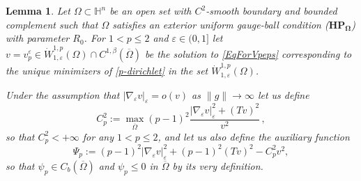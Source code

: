 \documentclass[10pt]{amsart}
\numberwithin{equation}{section}
\newtheorem{lemma}[theorem]{Lemma}
\theoremstyle{definition}
\newcommand{\He}{\mathbb{H}}
\begin{document}
\begin{lemma}\label{lem:conti_in_xp}
Let $\Omega \subset \He^n$ be an open set with $C^2$-smooth boundary and bounded complement such that $\Omega$ satisfies an exterior uniform gauge-ball condition ($\mathbf{HP_\Omega}$) with parameter $R_0$. For $1<p\leq 2$ and $\varepsilon \in (0,1]$ let $v=v_p^\varepsilon \in  \dot{W}^{1,p}_{1,\varepsilon}(\Omega) \cap C^{1,\beta}(\overline{\Omega})$ be the solution to \eqref{EqForVpeps} corresponding to the unique minimizers of \eqref{p-dirichlet}  
in the set $\dot{W}^{1,p}_{1, \varepsilon} (\Omega)$. 

Under the assumption that $|\nabla_\varepsilon  v |_\varepsilon=o(v)$ as $\| g\| \to \infty$ let us define
\begin{equation}\label{eq:def_Cp2}
	C_p^2:= \max_{\overline{\Omega}}(p-1)^{2}\dfrac{|\nabla_{\varepsilon}v|_{\varepsilon}^{2} + (Tv)^2}{v^2} \, ,
\end{equation}	
so that $C_{p}^2 < +\infty$ for any $1 <p \leq 2$, and let us also define the auxiliary function
\begin{equation}\label{eq:Def_Psi_p}
	\Psi_{p} := (p-1)^{2}|\nabla_{\varepsilon}v|_{\varepsilon}^{2} + (p-1)^{2}(Tv)^2 - C_p^2 v^2,
\end{equation}
so that $\psi_p \in C_b(\overline{\Omega})$ and $\psi_p \leq 0$ in $\overline{\Omega}$ by its very definition.




\end{lemma}
\end{document}
